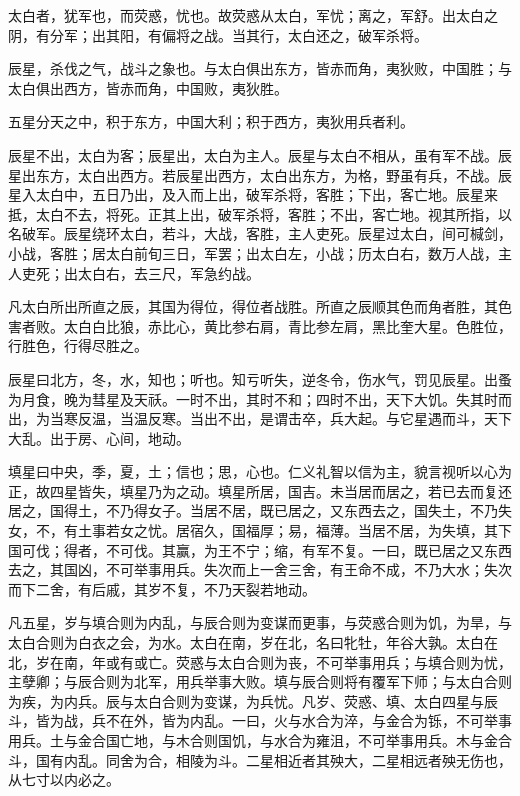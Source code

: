 \documentclass[12pt,UTF8]{ctexbook}
\begin{document}
太白者，犹军也，而荧惑，忧也。故荧惑从太白，军忧；离之，军舒。出太白之阴，有分军；出其阳，有偏将之战。当其行，太白还之，破军杀将。



辰星，杀伐之气，战斗之象也。与太白俱出东方，皆赤而角，夷狄败，中国胜；与太白俱出西方，皆赤而角，中国败，夷狄胜。



五星分天之中，积于东方，中国大利；积于西方，夷狄用兵者利。



辰星不出，太白为客；辰星出，太白为主人。辰星与太白不相从，虽有军不战。辰星出东方，太白出西方。若辰星出西方，太白出东方，为格，野虽有兵，不战。辰星入太白中，五日乃出，及入而上出，破军杀将，客胜；下出，客亡地。辰星来抵，太白不去，将死。正其上出，破军杀将，客胜；不出，客亡地。视其所指，以名破军。辰星绕环太白，若斗，大战，客胜，主人吏死。辰星过太白，间可椷剑，小战，客胜；居太白前旬三日，军罢；出太白左，小战；历太白右，数万人战，主人吏死；出太白右，去三尺，军急约战。



凡太白所出所直之辰，其国为得位，得位者战胜。所直之辰顺其色而角者胜，其色害者败。太白白比狼，赤比心，黄比参右肩，青比参左肩，黑比奎大星。色胜位，行胜色，行得尽胜之。



辰星曰北方，冬，水，知也；听也。知亏听失，逆冬令，伤水气，罚见辰星。出蚤为月食，晚为彗星及天祅。一时不出，其时不和；四时不出，天下大饥。失其时而出，为当寒反温，当温反寒。当出不出，是谓击卒，兵大起。与它星遇而斗，天下大乱。出于房、心间，地动。



填星曰中央，季，夏，土；信也；思，心也。仁义礼智以信为主，貌言视听以心为正，故四星皆失，填星乃为之动。填星所居，国吉。未当居而居之，若已去而复还居之，国得土，不乃得女子。当居不居，既已居之，又东西去之，国失土，不乃失女，不，有土事若女之忧。居宿久，国福厚；易，福薄。当居不居，为失填，其下国可伐；得者，不可伐。其赢，为王不宁；缩，有军不复。一曰，既已居之又东西去之，其国凶，不可举事用兵。失次而上一舍三舍，有王命不成，不乃大水；失次而下二舍，有后戚，其岁不复，不乃天裂若地动。



凡五星，岁与填合则为内乱，与辰合则为变谋而更事，与荧惑合则为饥，为旱，与太白合则为白衣之会，为水。太白在南，岁在北，名曰牝牡，年谷大孰。太白在北，岁在南，年或有或亡。荧惑与太白合则为丧，不可举事用兵；与填合则为忧，主孽卿；与辰合则为北军，用兵举事大败。填与辰合则将有覆军下师；与太白合则为疾，为内兵。辰与太白合则为变谋，为兵忧。凡岁、荧惑、填、太白四星与辰斗，皆为战，兵不在外，皆为内乱。一曰，火与水合为淬，与金合为铄，不可举事用兵。土与金合国亡地，与木合则国饥，与水合为雍沮，不可举事用兵。木与金合斗，国有内乱。同舍为合，相陵为斗。二星相近者其殃大，二星相远者殃无伤也，从七寸以内必之。
\end{document}
